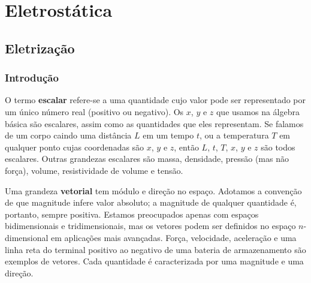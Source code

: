 \documentclass[
	12pt,				        %
	openright,			    %
	twoside,			      %
	a4paper,			      %
	chapter=TITLE,		  %
	section=TITLE,		  %
	subsection=TITLE,	  %
	subsubsection=TITLE,%
	english,			      %
	french,				      %
	brazil,				      %
	sumario=tradicional
]{abntex2}
\renewcommand{\textual}{%
  \pagestyle{abntbookheadings}%
  \aliaspagestyle{chapter}{abntbookchapfirst}%
  \nouppercaseheads%
  \bookmarksetup{startatroot}%
}
\begin{document}
\listoffigures*
\cleardoublepage

\listoftables*
\cleardoublepage

\tableofcontents*
\cleardoublepage

\mainmatter

\part[Eletrostática]{Eletrostática}

\chapter[Eletrização]{Eletrização}

\section{Introdução}

O termo \textbf{escalar} refere-se a uma quantidade cujo valor pode ser representado por um único número real (positivo ou negativo). Os $x$, $y$ e $z$ que usamos na álgebra básica são escalares, assim como as quantidades que eles representam. Se falamos de um corpo caindo uma distância $L$ em um tempo $t$, ou a temperatura $T$ em qualquer ponto cujas coordenadas são $x$, $y$ e $z$, então $L$, $t$, $T$, $x$, $y$ e $z$ são todos escalares. Outras grandezas escalares são massa, densidade, pressão (mas não força), volume, resistividade de volume e tensão.

Uma grandeza \textbf{vetorial} tem módulo e direção no espaço. Adotamos a convenção de que magnitude infere valor absoluto; a magnitude de qualquer quantidade é, portanto, sempre positiva. Estamos preocupados apenas com espaços bidimensionais e tridimensionais, mas os vetores podem ser definidos no espaço $n$-dimensional em aplicações mais avançadas. Força, velocidade, aceleração e uma linha reta do terminal positivo ao negativo de uma bateria de armazenamento são exemplos de vetores. Cada quantidade é caracterizada por uma magnitude e uma direção.
\end{document}
